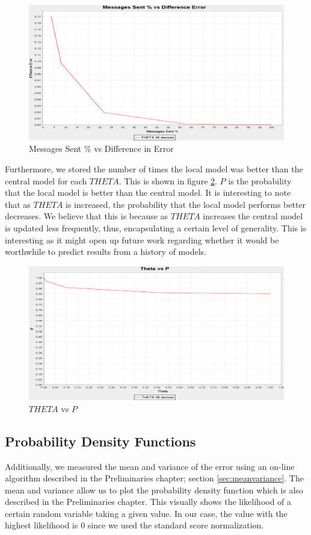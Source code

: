 \documentclass{mproj}
\begin{document}
\begin{figure}[H]
\caption{Messages Sent \% vs Difference in Error}
\label{fig:MessagesDe}
\centerline{\includegraphics[scale=0.4]{MessagesDe}}
\end{figure}

Furthermore, we stored the number of times the local model was better than the central model for each $THETA$. This is shown in figure \ref{fig:thetaP}. $P$ is the probability that the local model is better than the central model. It is interesting to note that as $THETA$ is increased, the probability that the local model performs better decreases. We believe that this is because as $THETA$ increases the central model is updated less frequently, thus, encapsulating a certain level of generality. This is interesting as it might open up future work regarding whether it would be worthwhile to predict results from a history of models.

\begin{figure}[H]
\caption{$THETA$ vs $P$}
\label{fig:thetaP}
\centerline{\includegraphics[scale=0.3]{thetaP}}
\end{figure}

\subsection{Probability Density Functions}
Additionally, we measured the mean and variance of the error using an on-line algorithm described in the Preliminaries chapter; section \ref{sec:meanvariance}. The mean and variance allow us to plot the probability density function which is also described in the Preliminaries chapter. This visually shows the likelihood of a certain random variable taking a given value. In our case, the value with the highest likelihood is 0 since we used the standard score normalization.
\end{document}
